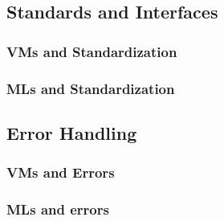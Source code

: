 \documentclass{sig-alternate}
\begin{document}
\subsection*{Standards and Interfaces} \cite{Shetty:2009}

\subsubsection*{VMs and Standardization}

\subsubsection*{MLs and Standardization}



\subsection*{Error Handling}

\subsubsection*{VMs and Errors}

\subsubsection*{MLs and errors}








  
\end{document}
